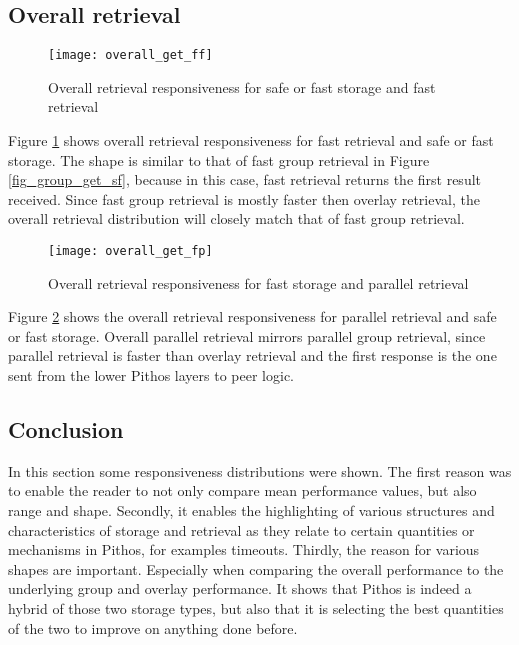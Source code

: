 \subsection{Overall retrieval}

\begin{figure}[htbp]
 \centering
 \texttt{[image: overall\_get\_ff]}
 \caption{Overall retrieval responsiveness for safe or fast storage and fast retrieval}
 \label{fig_overall_get_ff}
\end{figure}
%
Figure \ref{fig_overall_get_ff} shows overall retrieval responsiveness for fast retrieval and safe or fast storage. The shape is similar to that of fast group retrieval in Figure \ref{fig_group_get_sf}, because in this case, fast retrieval returns the first result received. Since fast group retrieval is mostly faster then overlay retrieval, the overall retrieval distribution will closely match that of fast group retrieval.

\begin{figure}[htbp]
 \centering
 \texttt{[image: overall\_get\_fp]}
 \caption{Overall retrieval responsiveness for fast storage and parallel retrieval}
 \label{fig_overall_get_fp}
\end{figure}
%
Figure \ref{fig_overall_get_fp} shows the overall retrieval responsiveness for parallel retrieval and safe or fast storage. Overall parallel retrieval mirrors parallel group retrieval, since parallel retrieval is faster than overlay retrieval and the first response is the one sent from the lower Pithos layers to peer logic.

\subsection{Conclusion}

In this section some responsiveness distributions were shown. The first reason was to enable the reader to not only compare mean performance values, but also range and shape. Secondly, it enables the highlighting of various structures and characteristics of storage and retrieval as they relate to certain quantities or mechanisms in Pithos, for examples timeouts. Thirdly, the reason for various shapes are important. Especially when comparing the overall performance to the underlying group and overlay performance. It shows that Pithos is indeed a hybrid of those two storage types, but also that it is selecting the best quantities of the two to improve on anything done before.

